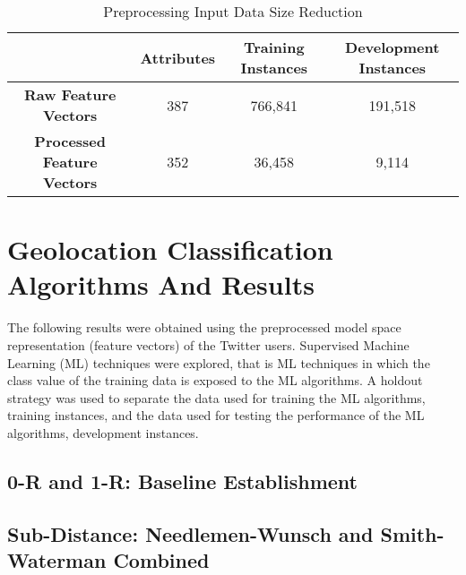 \documentclass[11pt]{article}
\begin{document}
\begin{table} [th]
\caption{Preprocessing Input Data Size Reduction}
\centering
	\begin{tabular}{| c | c | c | c |}
	\hline
	 & \textbf{Attributes} & \textbf{Training Instances} & \textbf{Development Instances}  \\
	\hline
	\textbf{Raw Feature Vectors} & 387 & 766,841 & 191,518\\
	\hline
	\textbf{Processed Feature Vectors} & 352 & 36,458 & 9,114\\
	\hline
	\end{tabular}
\label{table:input-table}
\end{table}

\section{Geolocation Classification Algorithms And Results}

The following results were obtained using the preprocessed model space representation (feature vectors) of the Twitter users. Supervised Machine Learning (ML) techniques were explored, that is ML techniques in which the class value of the training data is exposed to the ML algorithms. A holdout strategy was used to separate the data used for training the ML algorithms, training instances, and the data used for testing the performance of the ML algorithms, development instances.

\subsection{0-R and 1-R: Baseline Establishment}   

\subsection{Sub-Distance: Needlemen-Wunsch and Smith-Waterman Combined}
\end{document}
